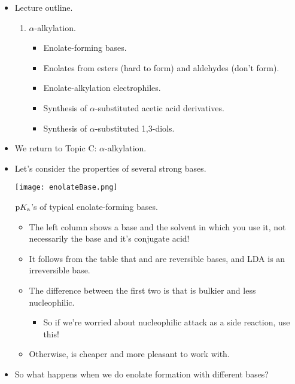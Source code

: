 \documentclass[../notes.tex]{subfiles}
\begin{document}
\begin{itemize}
    \pagebreak
    \item Lecture outline.
    \begin{enumerate}[label={\Alph*.},start=3]
        \item $\alpha$-alkylation.
        \begin{itemize}
            \item Enolate-forming bases.
            \item Enolates from esters (hard to form) and aldehydes (don't form).
            \item Enolate-alkylation electrophiles.
            \item Synthesis of $\alpha$-substituted acetic acid derivatives.
            \item Synthesis of $\alpha$-substituted 1,3-diols.
        \end{itemize}
    \end{enumerate}
    \item We return to Topic C: $\alpha$-alkylation.
    \item Let's consider the properties of several strong bases.
    \begin{table}[h!]
        \centering
        \texttt{[image: enolateBase.png]}
        \caption{$\textup{p}K_\textup{a}$'s of typical enolate-forming bases.}
        \label{tab:enolateBase}
    \end{table}
    \begin{itemize}
        \item The left column shows a base and the solvent in which you use it, not necessarily the base and it's conjugate acid!
        \item It follows from the table that  and  are reversible bases, and LDA is an irreversible base.
        \item The difference between the first two is that  is bulkier and less nucleophilic.
        \begin{itemize}
            \item So if we're worried about nucleophilic attack as a side reaction, use this!
        \end{itemize}
        \item Otherwise,  is cheaper and more pleasant to work with.
    \end{itemize}
    \item So what happens when we do enolate formation with different bases?
    \begin{itemize}

\end{itemize}
\end{itemize}
\end{document}
